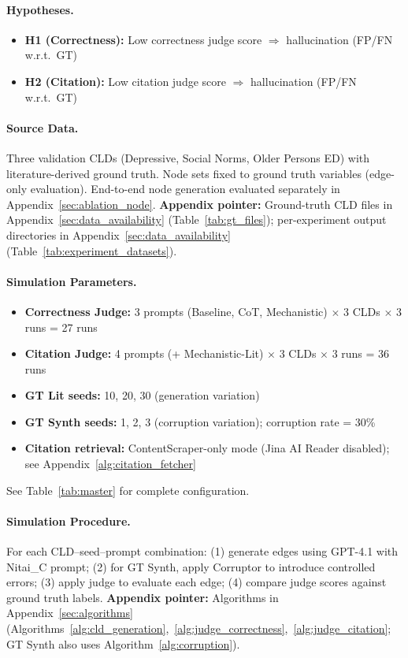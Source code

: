 \paragraph{Hypotheses.}
\begin{itemize}[noitemsep]
    \item \textbf{H1 (Correctness):} Low correctness judge score $\Rightarrow$ hallucination (FP/FN w.r.t.\ GT)
    \item \textbf{H2 (Citation):} Low citation judge score $\Rightarrow$ hallucination (FP/FN w.r.t.\ GT)
\end{itemize}

\paragraph{Source Data.}
Three validation CLDs (Depressive, Social Norms, Older Persons ED) with literature-derived ground truth. Node sets fixed to ground truth variables (edge-only evaluation). End-to-end node generation evaluated separately in Appendix~\ref{sec:ablation_node}.
\textbf{Appendix pointer:} Ground-truth CLD files in Appendix~\ref{sec:data_availability} (Table~\ref{tab:gt_files}); per-experiment output directories in Appendix~\ref{sec:data_availability} (Table~\ref{tab:experiment_datasets}).

\paragraph{Simulation Parameters.}
\begin{itemize}[noitemsep]
    \item \textbf{Correctness Judge:} 3 prompts (Baseline, CoT, Mechanistic) $\times$ 3 CLDs $\times$ 3 runs = 27 runs
    \item \textbf{Citation Judge:} 4 prompts (+ Mechanistic-Lit) $\times$ 3 CLDs $\times$ 3 runs = 36 runs
    \item \textbf{GT Lit seeds:} 10, 20, 30 (generation variation)
    \item \textbf{GT Synth seeds:} 1, 2, 3 (corruption variation); corruption rate = 30\%
    \item \textbf{Citation retrieval:} ContentScraper-only mode (Jina AI Reader disabled); see Appendix~\ref{alg:citation_fetcher}
\end{itemize}
See Table~\ref{tab:master} for complete configuration.

\paragraph{Simulation Procedure.}
For each CLD--seed--prompt combination: (1) generate edges using GPT-4.1 with Nitai\_C prompt; (2) for GT Synth, apply Corruptor to introduce controlled errors; (3) apply judge to evaluate each edge; (4) compare judge scores against ground truth labels.
\textbf{Appendix pointer:} Algorithms in Appendix~\ref{sec:algorithms} (Algorithms~\ref{alg:cld_generation},~\ref{alg:judge_correctness},~\ref{alg:judge_citation}; GT Synth also uses Algorithm~\ref{alg:corruption}).

